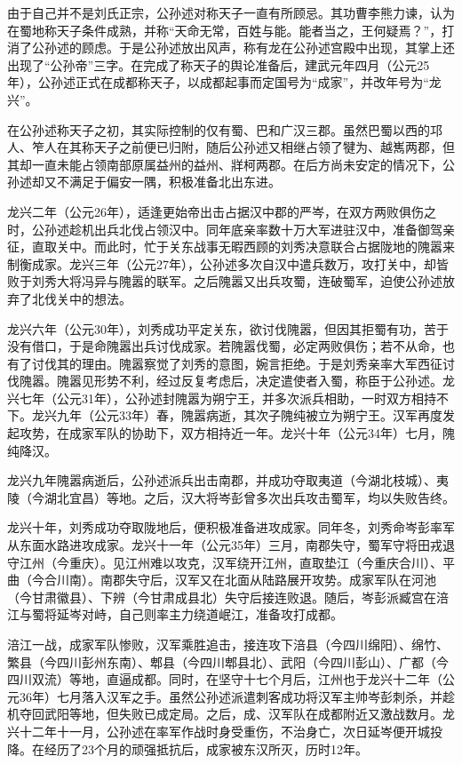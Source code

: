由于自己并不是刘氏正宗，公孙述对称天子一直有所顾忌。其功曹李熊力谏，认为在蜀地称天子条件成熟，并称“天命无常，百姓与能。能者当之，王何疑焉？”，打消了公孙述的顾虑。于是公孙述放出风声，称有龙在公孙述宫殿中出现，其掌上还出现了“公孙帝”三字。在完成了称天子的舆论准备后，建武元年四月（公元25年），公孙述正式在成都称天子，以成都起事而定国号为“成家”，并改年号为“龙兴”。

在公孙述称天子之初，其实际控制的仅有蜀、巴和广汉三郡。虽然巴蜀以西的邛人、笮人在其称天子之前便已归附，随后公孙述又相继占领了犍为、越嶲两郡，但其却一直未能占领南部原属益州的益州、牂柯两郡。在后方尚未安定的情况下，公孙述却又不满足于偏安一隅，积极准备北出东进。

龙兴二年（公元26年），适逢更始帝出击占据汉中郡的严岑，在双方两败俱伤之时，公孙述趁机出兵北伐占领汉中。同年底亲率数十万大军进驻汉中，准备御驾亲征，直取关中。而此时，忙于关东战事无暇西顾的刘秀决意联合占据陇地的隗嚣来制衡成家。龙兴三年（公元27年），公孙述多次自汉中遣兵数万，攻打关中，却皆败于刘秀大将冯异与隗嚣的联军。之后隗嚣又出兵攻蜀，连破蜀军，迫使公孙述放弃了北伐关中的想法。

龙兴六年（公元30年），刘秀成功平定关东，欲讨伐隗嚣，但因其拒蜀有功，苦于没有借口，于是命隗嚣出兵讨伐成家。若隗嚣伐蜀，必定两败俱伤；若不从命，也有了讨伐其的理由。隗嚣察觉了刘秀的意图，婉言拒绝。于是刘秀亲率大军西征讨伐隗嚣。隗嚣见形势不利，经过反复考虑后，决定遣使者入蜀，称臣于公孙述。龙兴七年（公元31年），公孙述封隗嚣为朔宁王，并多次派兵相助，一时双方相持不下。龙兴九年（公元33年）春，隗嚣病逝，其次子隗纯被立为朔宁王。汉军再度发起攻势，在成家军队的协助下，双方相持近一年。龙兴十年（公元34年）七月，隗纯降汉。

龙兴九年隗嚣病逝后，公孙述派兵出击南郡，并成功夺取夷道（今湖北枝城）、夷陵（今湖北宜昌）等地。之后，汉大将岑彭曾多次出兵攻击蜀军，均以失败告终。

龙兴十年，刘秀成功夺取陇地后，便积极准备进攻成家。同年冬，刘秀命岑彭率军从东面水路进攻成家。龙兴十一年（公元35年）三月，南郡失守，蜀军守将田戎退守江州（今重庆）。见江州难以攻克，汉军绕开江州，直取垫江（今重庆合川）、平曲（今合川南）。南郡失守后，汉军又在北面从陆路展开攻势。成家军队在河池（今甘肃徽县）、下辨（今甘肃成县北）失守后接连败退。随后，岑彭派臧宫在涪江与蜀将延岑对峙，自己则率主力绕道岷江，准备攻打成都。

涪江一战，成家军队惨败，汉军乘胜追击，接连攻下涪县（今四川绵阳）、绵竹、繁县（今四川彭州东南）、郫县（今四川郫县北）、武阳（今四川彭山）、广都（今四川双流）等地，直逼成都。同时，在坚守十七个月后，江州也于龙兴十二年（公元36年）七月落入汉军之手。虽然公孙述派遣刺客成功将汉军主帅岑彭刺杀，并趁机夺回武阳等地，但失败已成定局。之后，成、汉军队在成都附近又激战数月。龙兴十二年十一月，公孙述在率军作战时身受重伤，不治身亡，次日延岑便开城投降。在经历了23个月的顽强抵抗后，成家被东汉所灭，历时12年。

